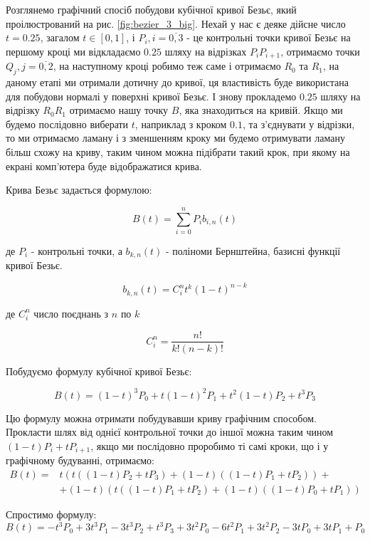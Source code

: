 \documentclass[14pt,a4paper]{extarticle}
\theoremstyle{definition}
\renewcommand{\[}{\begin{singlespace}\begin{equation*}}
\renewcommand{\]}{\end{equation*}\end{singlespace}}
\begin{document}
Розглянемо графічний спосіб побудови кубічної кривої Безьє, який проілюстрований на рис. \ref{fig:bezier_3_big}. Нехай у нас є деяке дійсне число $t=0.25$, загалом $t \in [0,1]$, і $P_i, i=\overline{0,3}$ - це контрольні точки кривої Безьє на першому кроці ми відкладаємо $0.25$ шляху на відрізках $P_iP_{i+1}$, отримаємо точки $Q_{j}, j=\overline{0,2}$, на наступному кроці робимо теж саме і отримаємо $R_0$ та $R_1$, на даному етапі ми отримали дотичну до кривої, ця властивість буде використана для побудови нормалі у поверхні кривої Безьє. І знову прокладемо $0.25$ шляху на відрізку $R_0R_1$ отримаємо нашу точку $B$, яка знаходиться на кривій. Якщо ми будемо послідовно виберати $t$, наприклад з кроком $0.1$, та з'єднувати у відрізки, то ми отримаємо ламану і з зменшенням кроку ми будемо отримувати ламану більш схожу на криву, таким чином можна підібрати такий крок, при якому на екрані комп'ютера буде відображатися крива.

Крива Безьє задається формулою:
\[B(t)=\sum_{i=0}^n P_i b_{i,n}(t)\]
де $P_i$ - контрольні точки, а $b_{k,n}(t)$ - поліноми Бернштейна, базисні функції кривої Безьє.
\[b_{k,n}(t)=C_i^nt^k(1-t)^{n-k}\]
де $C_i^n$ число поєднань з $n$ по $k$
\[C_i^n=\frac{n!}{k!(n-k)!}\]

Побудуємо формулу кубічної кривої Безьє:
\[B(t)=(1-t)^3P_0+t(1-t)^2P_1+t^2(1-t)P_2+t^3P_3\]

Цю формулу можна отримати побудувавши криву графічним способом. Прокласти шлях від однієї контрольної точки до іншої можна таким чином $(1-t)P_i+tP_{i+1}$, якщо ми послідовно проробимо ті самі кроки, що і у графічному будуванні, отримаємо:
\begin{align*}
B(t)=&t (t ((1 - t) P_{2} + t P_{3}) + (1 - t) ((1 - t) P_{1} + t P_{2})) +\\
&+(1 - t) (t ((1 - t) P_{1} + t P_{2}) + (1 - t) ((1 - t) P_{0} + t P_{1}))
\end{align*}

Спростимо формулу:
\begin{equation}
\label{eq:bezier_curve}
B(t) = -t^3P_0+3t^3P_1-3t^3P_2+t^3P_3 + 3t^2P_0-6t^2P_1+3t^2P_2 - 3tP_0+3tP_1 + P_0
\end{equation}
\end{document}
